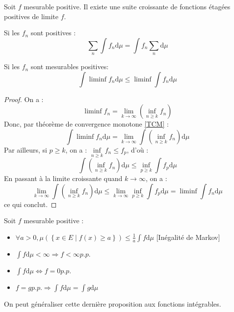 \documentclass{cours}
\begin{document}
\begin{theorem}
    Soit $f$ mesurable positive. Il existe une suite croissante de fonctions étagées positives de limite $f$.
\end{theorem}
\begin{corollary}
    Si les $f_{n}$ sont positives : \[
        \sum_{n} \int f_{n} \mathrm{d}\mu = \int f_{n} \sum_{n }\mathrm{d}\mu
    \]
\end{corollary}
\begin{theorem}
    Si les $f_{n}$ sont mesurables positives:
    \[
        \int \liminf f_{n} \mathrm{d}\mu \leq \liminf \int f_{n} \mathrm{d}\mu
    \]
\end{theorem}

\begin{proof}
    On a : \[
        \liminf f_{n} = \lim_{k \to \infty} (\inf_{n \geq k} f_{n})        \]
    Donc, par théorème de convergence monotone \ref{TCM} : \[
        \int \liminf f_{n} \mathrm{d}\mu = \lim_{k \to \infty} \int \left(\inf_{n \geq k} f_{n}\right) \mathrm{d}\mu
    \]
    Par ailleurs, si $p \geq k$, on a : $\inf\limits_{n \geq k} f_{n} \leq f_{p}$, d'où : \[
        \int \left(\inf_{n \geq k} f_{n}\right) \mathrm{d}\mu \leq \inf_{p\geq k} \int f_{p} \mathrm{d}\mu
    \]
    En passant à la limite croissante quand $k \to \infty$, on a : \[
        \lim_{k \to \infty} \int \left(\inf_{n \geq k} f_{n}\right)\mathrm{d}\mu \leq \lim_{k \to \infty} \inf_{p \geq k} \int f_{p} \mathrm{d}\mu = \liminf \int f_{n} \mathrm{d}\mu
    \]
    ce qui conclut.
\end{proof}

\begin{proposition}
    Soit $f$ mesurable positive :
    \begin{itemize}
        \item $\forall a > 0, \mu \left(\left\{x \in E \mid f(x) \geq a\right\}\right) \leq \frac{1}{a}\int f \mathrm{d} \mu$ [Inégalité de Markov]
        \item $\int f \mathrm{d}\mu < \infty \Rightarrow f < \infty p.p.$
        \item $\int f \mathrm{d}\mu \Leftrightarrow f = 0 p.p.$
        \item $f = g p.p. \Rightarrow \int f \mathrm{d}\mu = \int g \mathrm{d}\mu$
    \end{itemize}
    On peut généraliser cette dernière proposition aux fonctions intégrables.
\end{proposition}
\end{document}
